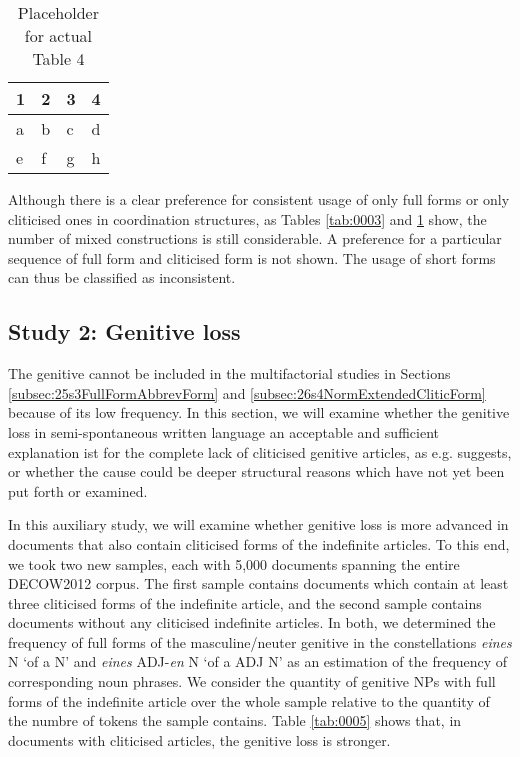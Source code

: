 \begin{table}
	\centering
	\begin{tabular}{llll}
		\toprule
		\textbf{1} & \textbf{2} & \textbf{3} & \textbf{4} \\
		\midrule
		a & b & c & d \\
		e & f & g & h \\
		\bottomrule
	\end{tabular}
	\caption{Placeholder for actual Table 4}
	\label{tab:0004}
\end{table}

Although there is a clear preference for consistent usage of only full forms or only cliticised ones in coordination structures, as Tables \ref{tab:0003} and \ref{tab:0004} show, the number of mixed constructions is still considerable.
A preference for a particular sequence of full form and cliticised form is not shown.
The usage of short forms can thus be classified as inconsistent.

\subsection{Study 2: Genitive loss}
\label{subsec:24s2GenLoss}

The genitive cannot be included in the multifactorial studies in Sections \ref{subsec:25s3FullFormAbbrevForm} and \ref{subsec:26s4NormExtendedCliticForm} because of its low frequency.
In this section, we will examine whether the genitive loss in semi-spontaneous written language an acceptable and sufficient explanation ist for the complete lack of cliticised genitive articles, as e.g. \citet[5]{Burri2003} suggests, or whether the cause could be deeper structural reasons which have not yet been put forth or examined.

In this auxiliary study, we will examine whether genitive loss is more advanced in documents that also contain cliticised forms of the indefinite articles. %
To this end, we took two new samples, each with 5,000 documents spanning the entire DECOW2012 corpus.
The first sample contains documents which contain at least three cliticised forms of the indefinite article, and the second sample contains documents without any cliticised indefinite articles.
In both, we determined the frequency of full forms of the masculine/neuter genitive in the constellations \textit{eines} N `of a N' and \textit{eines} ADJ-\textit{en} N `of a ADJ N' as an estimation of the frequency of corresponding noun phrases. %
We consider the quantity of genitive NPs with full forms of the indefinite article over the whole sample relative to the quantity of the numbre of tokens the sample contains. 
Table \ref{tab:0005} shows that, in documents with cliticised articles, the genitive loss is stronger.

